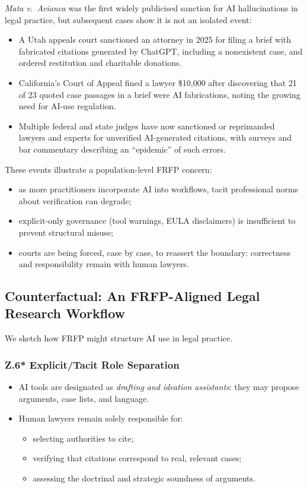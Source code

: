 \emph{Mata v.\ Avianca} was the first widely publicised sanction for AI
hallucinations in legal practice, but subsequent cases show it is not an
isolated event:

\begin{itemize}
  \item A Utah appeals court sanctioned an attorney in 2025 for filing a brief
        with fabricated citations generated by ChatGPT, including a nonexistent
        case, and ordered restitution and charitable donations.
  \item California’s Court of Appeal fined a lawyer \$10{,}000 after
        discovering that 21 of 23 quoted case passages in a brief were AI
        fabrications, noting the growing need for AI-use regulation.
  \item Multiple federal and state judges have now sanctioned or reprimanded
        lawyers and experts for unverified AI-generated citations, with
        surveys and bar commentary describing an ``epidemic'' of such
        errors.
\end{itemize}

These events illustrate a population-level FRFP concern:

\begin{itemize}
  \item as more practitioners incorporate AI into workflows,
        tacit professional norms about verification can degrade;
  \item explicit-only governance (tool warnings, EULA disclaimers) is
        insufficient to prevent structural misuse;
  \item courts are being forced, case by case, to reassert the boundary:
        correctness and responsibility remain with human lawyers.
\end{itemize}

\subsection{Counterfactual: An FRFP-Aligned Legal Research Workflow}

We sketch how FRFP might structure AI use in legal practice.

\subsubsection*{Z.6* Explicit/Tacit Role Separation}

\begin{itemize}
  \item AI tools are designated as \emph{drafting and ideation assistants}:
        they may propose arguments, case lists, and language.
  \item Human lawyers remain solely responsible for:
        \begin{itemize}
          \item selecting authorities to cite;
          \item verifying that citations correspond to real, relevant cases;
          \item assessing the doctrinal and strategic soundness of arguments.
        \end{itemize}
\end{itemize}

